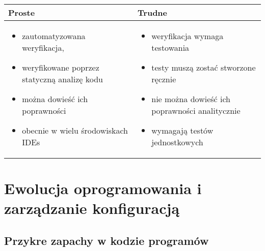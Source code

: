 \documentclass[a4paper]{article}
\begin{document}
    \begin{table}[H]
        \begin{center}
            \begin{tabular}{ p{8cm} p{8cm} }
                \textbf{Proste} & \textbf{Trudne} \\
                \toprule
                \begin{itemize}
                    \item zautomatyzowana weryfikacja,
                    \item weryfikowane poprzez statyczną analizę kodu
                    \item można dowieść ich poprawności
                    \item obecnie w wielu środowiskach IDEs
                \end{itemize}
                &
                \begin{itemize}
                    \item weryfikacja wymaga testowania
                    \item testy muszą zostać stworzone ręcznie
                    \item nie można dowieść ich poprawności analitycznie
                    \item wymagają testów jednostkowych
                \end{itemize}
            \end{tabular}
        \end{center}
    \end{table}


    \section{Ewolucja oprogramowania i zarządzanie konfiguracją}

    \subsection{Przykre zapachy w kodzie programów}
\end{document}
